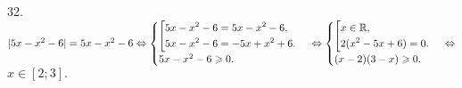 32. $|5x-x^2-6|=5x-x^2-6\Leftrightarrow \begin{cases}\left[
      \begin{gathered} 5x-x^2-6=5x-x^2-6,\hfill\\
      5x-x^2-6=-5x+x^2+6.\hfill \end{gathered}\right.\\
5x-x^2-6\geqslant0.\end{cases}\Leftrightarrow \begin{cases}\left[
      \begin{gathered} x\in\mathbb{R},\hfill\\
      2(x^2-5x+6)=0.\hfill \end{gathered}\right.\\
(x-2)(3-x)\geqslant0.\end{cases}\Leftrightarrow$\\$ x\in[2;3].$\\
